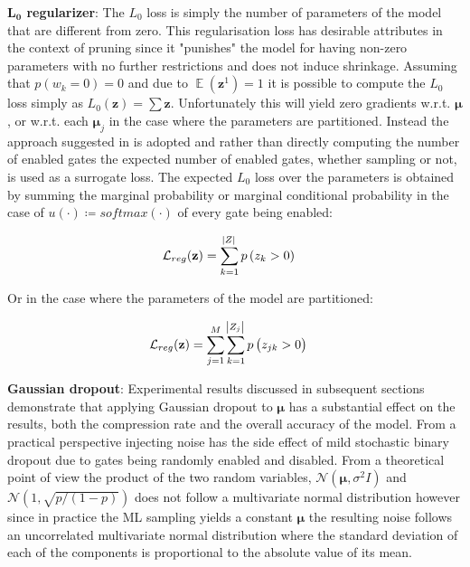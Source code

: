 \documentclass[final,1p,times]{elsarticle}
\DeclareMathOperator*{\E}{\mathbb{E}}
\begin{document}
\textbf{$\mathbf{L_0}$ regularizer}: The $L_0$ loss is simply the number of parameters of the model that are different from zero. This regularisation loss has desirable attributes in the context of pruning since it "punishes" the model for having non-zero parameters with no further restrictions and does not induce shrinkage. Assuming that $p(w_k = 0) = 0$ and due to $\E (\mathbf{z}^1 ) = 1$ it is possible to compute the $L_0$ loss simply as $L_0(\mathbf{z}) = \sum \mathbf{z}$. Unfortunately this will yield zero gradients w.r.t. $\boldsymbol{\mu}$, or w.r.t. each $\boldsymbol{\mu}_j$ in the case where the parameters are partitioned. Instead the approach suggested in \cite{louizos2018learning} is adopted and rather than directly computing the number of enabled gates the expected number of enabled gates, whether sampling or not, is used as a surrogate loss. The expected $L_0$ loss over the parameters is obtained by summing the marginal probability or marginal conditional probability in the case of $u(\cdot) \coloneqq softmax(\cdot)$ of every gate being enabled:

\begin{align}
& \mathcal{L}_{reg}(\mathbf{z}) = \sum_{k = 1}^{\abs{Z}} p \left(z_k > 0 \right)
\end{align}

Or in the case where the parameters of the model are partitioned:

\begin{align}
& \mathcal{L}_{reg}(\mathbf{z}) = \sum_{j = 1}^{M} \sum_{k = 1}^{\abs{Z_{j}}} p \left(z_{jk} > 0 \right) \label{eq:l0_loss_total_all_partitions}
\end{align}

\textbf{Gaussian dropout}: Experimental results discussed in subsequent sections demonstrate that applying Gaussian dropout \cite{10.5555/2627435.2670313} to $\boldsymbol{\mu}$ has a substantial effect on the results, both the compression rate and the overall accuracy of the model. From a practical perspective injecting noise has the side effect of mild stochastic binary dropout due to gates being randomly enabled and disabled. From a theoretical point of view the product of the two random variables, $\mathcal{N}(\boldsymbol{\mu}, \sigma^2 I)$ and $\mathcal{N}(1, \sqrt{p/(1-p)} )$ does not follow a multivariate normal distribution however since in practice the ML sampling yields a constant $\boldsymbol{\mu}$ the resulting noise follows an uncorrelated multivariate normal distribution where the standard deviation of each of the components is proportional to the absolute value of its mean.
\end{document}
